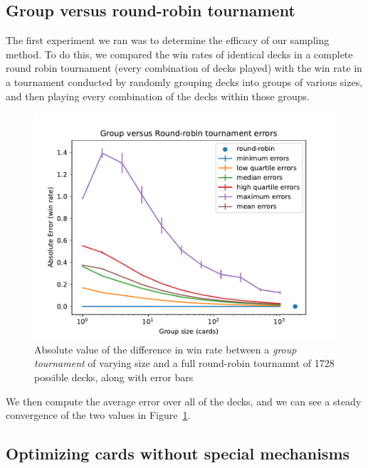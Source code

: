 \subsection{Group versus round-robin tournament}

The first experiment we ran was to determine the efficacy of our sampling method. To do this, we compared the win rates of identical decks in a complete round robin tournament (every combination of decks played) with the win rate in a tournament conducted by randomly grouping decks into groups of various sizes, and then playing every combination of the decks within those groups.

\begin{figure}[t]
	\centering
	\includegraphics[width=0.9\columnwidth]{group_vs_rr_fig}
	\caption{Absolute value of the difference in win rate between a \textit{group tournament} of varying size and a full round-robin tournamnt of 1728 possible decks, along with error bars}
	\label{fig:group_vs_rr}
\end{figure}


We then compute the average error over all of the decks, and we can see a steady convergence of the two values in Figure~\ref{fig:group_vs_rr}.


 \subsection{Optimizing cards without special mechanisms}

